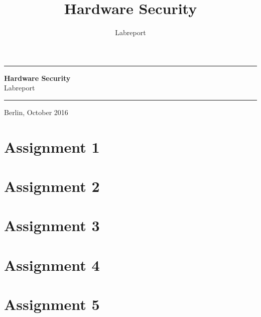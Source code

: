 \documentclass[a4paper, twoside, ngerman, 12pt]{scrartcl}
\title{Hardware Security}
\subtitle{Labreport}
\date{}
\begin{document}
    \begin{titlepage}
        \begin{figure*}
            \begin{flushright}
            \end{flushright}
        \end{figure*}
        \vspace*{-1cm}
        \hrule
        \vspace{.2cm}
        \begin{center}
            \vfill
            \textsf{\textbf{\Huge{Hardware Security}}}\\[1.5em]
            \textsf{\LARGE{Labreport}}
            \vfill
        \end{center}
        \vfill
        \hrule
        \vspace{.2cm}
        \large{Berlin, October 2016}
    \end{titlepage}
    
    \setcounter{page}{1}
    
    \section*{Assignment 1}
%    
    
    \section*{Assignment 2}
%    
    
    \section*{Assignment 3}
%    
    
    \section*{Assignment 4}
%    
    
    \section*{Assignment 5}
\end{document}
